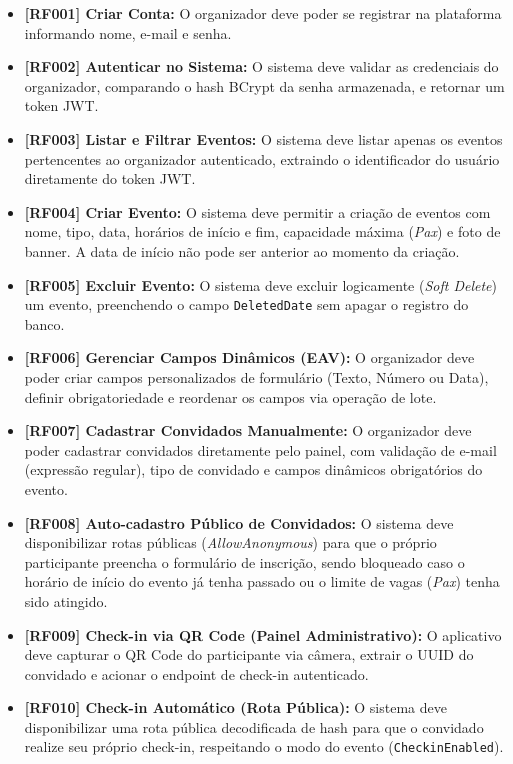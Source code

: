 \begin{itemize}
    \item \textbf{[RF001] Criar Conta:} O organizador deve poder se registrar na plataforma informando nome, e-mail e senha.
    \item \textbf{[RF002] Autenticar no Sistema:} O sistema deve validar as credenciais do organizador, comparando o hash BCrypt da senha armazenada, e retornar um token JWT.
    \item \textbf{[RF003] Listar e Filtrar Eventos:} O sistema deve listar apenas os eventos pertencentes ao organizador autenticado, extraindo o identificador do usuário diretamente do token JWT.
    \item \textbf{[RF004] Criar Evento:} O sistema deve permitir a criação de eventos com nome, tipo, data, horários de início e fim, capacidade máxima (\textit{Pax}) e foto de banner. A data de início não pode ser anterior ao momento da criação.
    \item \textbf{[RF005] Excluir Evento:} O sistema deve excluir logicamente (\textit{Soft Delete}) um evento, preenchendo o campo \texttt{DeletedDate} sem apagar o registro do banco.
    \item \textbf{[RF006] Gerenciar Campos Dinâmicos (EAV):} O organizador deve poder criar campos personalizados de formulário (Texto, Número ou Data), definir obrigatoriedade e reordenar os campos via operação de lote.
    \item \textbf{[RF007] Cadastrar Convidados Manualmente:} O organizador deve poder cadastrar convidados diretamente pelo painel, com validação de e-mail (expressão regular), tipo de convidado e campos dinâmicos obrigatórios do evento.
    \item \textbf{[RF008] Auto-cadastro Público de Convidados:} O sistema deve disponibilizar rotas públicas (\textit{AllowAnonymous}) para que o próprio participante preencha o formulário de inscrição, sendo bloqueado caso o horário de início do evento já tenha passado ou o limite de vagas (\textit{Pax}) tenha sido atingido.
    \item \textbf{[RF009] Check-in via QR Code (Painel Administrativo):} O aplicativo deve capturar o QR Code do participante via câmera, extrair o UUID do convidado e acionar o endpoint de check-in autenticado.
    \item \textbf{[RF010] Check-in Automático (Rota Pública):} O sistema deve disponibilizar uma rota pública decodificada de hash para que o convidado realize seu próprio check-in, respeitando o modo do evento (\texttt{CheckinEnabled}).

\end{itemize}

